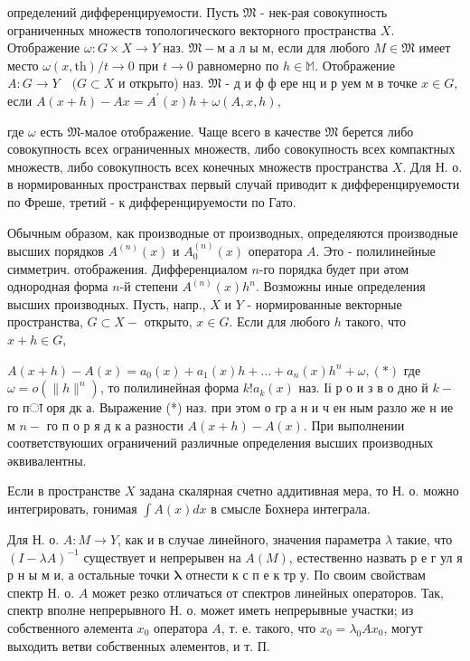 \documentclass[10pt]{article}
\begin{document}
определений дифференцируемости. Пусть $\mathfrak{M}$ - нек-рая совокупность ограниченных множеств топологического векторного пространства $X$. Отображение $\omega: G \times X \rightarrow Y$ наз. $\mathfrak{M}-м$ а л ы м, если для любого $M \in \mathfrak{M}$ имеет место $\omega(x, \mathrm{th}) / t \rightarrow 0$ при $t \rightarrow 0$ равномерно по $h \in \mathbb{M}$. Отображение $A: G \rightarrow Y \quad(G \subset X$ и открыто) наз. $\mathfrak{M}$ - д и ф ф ере нц и р уем м в точке $x \in G$, если $A(x+h)-A x=A^{\prime}(x) h+\omega(A, x, h)$,



где $\omega$ есть $\mathfrak{M}$-малое отображение. Чаще всего в качестве $\mathfrak{M}$ берется либо совокупность всех ограниченных множеств, либо совокупность всех компактных множеств, либо совокупность всех конечных множеств пространства $X$. Для Н. о. в нормированных пространствах первый случай приводит к дифференцируемости по Фреше, третий - к дифференцируемости по Гато.



Обычным образом, как производные от производных, определяются производные высших порядков $A^{(n)}(x)$ и $A_{0}^{(n)}(x)$ оператора $A$. Это - полилинейные симметрич. отображения. Дифференциалом $n$-го порядка будет при әтом однородная форма $n$-й степени $A^{(n)}(x) h^{n}$. Возможны иные определения высших производных. Пусть, напр., $X$ и $Y$ - нормированные векторные пространства, $G \subset X-$ открыто, $x \in G$. Если для любого $h$ такого, что $x+h \in G$,



$A(x+h)-A(x)=a_{0}(x)+a_{1}(x) h+\ldots+a_{n}(x) h^{n}+\omega,(*)$ где $\omega=o\left(\|h\|^{n}\right)$, то полилинейная форма $k ! a_{k}(x)$ наз. Іі р о и з в о дно й $k-$ го пा оря дк а. Выражение (*) наз. при этом о гр а н и ч ен ным разло же н ие м $n-$ го п о р я д к а разности $A(x+h)-A(x)$. При выполнении соответствуюших ограничений различные определения высших производных әквивалентны.



Если в пространстве $X$ задана скалярная счетно аддитивная мера, то Н. о. можно интегрировать, гонимая $\int A(x) d x$ в смысле Бохнера интеграла.



Для Н. о. $A: M \rightarrow Y$, как и в случае линейного, значения параметра $\lambda$ такие, что $(I-\lambda A)^{-1}$ существует и непрерывен на $A(M)$, естественно назвать р е г ул я р н ы м и, а остальные точки $\boldsymbol{\lambda}$ отнести к с п е к тр у. По своим свойствам спектр Н. о. $A$ может резко отличаться от спектров линейных операторов. Так, спектр вполне непрерывного Н. о. может иметь непрерывные участки; из собственного әлемента $x_{0}$ оператора $A$, т. е. такого, что $x_{0}=\lambda_{0} A x_{0}$, могут выходить ветви собственных әлементов, и т. П.
\end{document}
